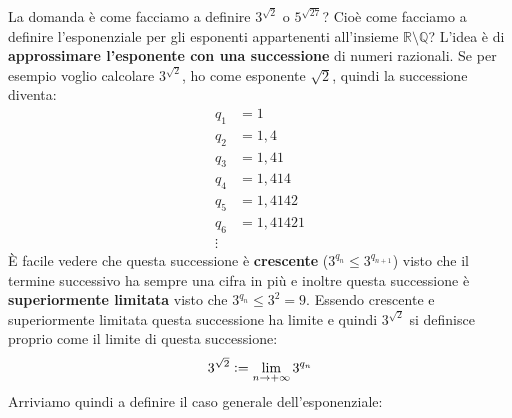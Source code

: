 La domanda è come facciamo a definire $3^{\sqrt{2}}$ o $5^{\sqrt{27}}$? Cioè come facciamo a definire l'esponenziale per gli esponenti appartenenti all'insieme $\mathbb{R}\setminus\mathbb{Q}$? L'idea è di \textbf{approssimare l'esponente con una successione} di numeri razionali. Se per esempio voglio calcolare $3^{\sqrt{2}}$, ho come esponente $\sqrt{2}$, quindi la successione diventa:
\begin{align*}
    q_1 &= 1\\
    q_2 &= 1,4\\
    q_3 &= 1,41\\
    q_4 &= 1,414\\
    q_5 &= 1,4142\\
    q_6 &= 1,41421\\
    \vdots
\end{align*}
È facile vedere che questa successione è \textbf{crescente} ($3^{q_n} \leq 3^{q_{n+1}}$) visto che il termine successivo ha sempre una cifra in più e inoltre questa successione è \textbf{superiormente limitata} visto che $3^{q_n} \leq 3^2 = 9$. Essendo crescente e superiormente limitata questa successione ha limite e quindi $3^{\sqrt{2}}$ si definisce proprio come il limite di questa successione:
\begin{equation*}
    3^{\sqrt{2}} \vcentcolon = \lim_{n\to +\infty} 3^{q_n}
\end{equation*}
Arriviamo quindi a definire il caso generale dell'esponenziale: \label{esponenziale}


